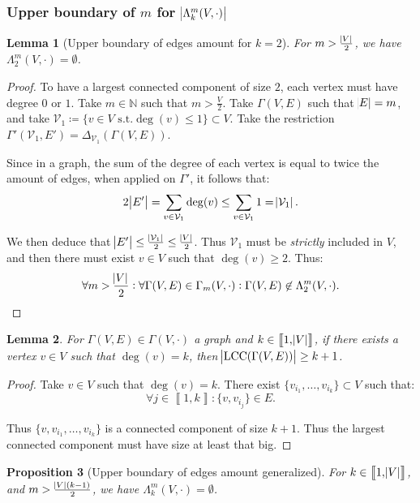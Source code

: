 \documentclass{article}
\newtheorem{lemma}{Lemma}[section]
\newtheorem{proposition}[lemma]{Proposition}
\theoremstyle{definition}
\theoremstyle{remark}
\DeclareMathOperator{\LCC}{LCC}
\newcommand{\N}{\mathbb N}
\newcommand{\intint}[2]{\left\llbracket#1, #2\right\rrbracket}
\newcommand{\st}{\text{ s.t.}}
\begin{document}
		\subsubsection{Upper boundary of $m$ for $\abs {\Lambda_k^m(V, \cdot)}$}
			\begin{lemma}[Upper boundary of edges amount for $k=2$]\label{lemma:upper boundary k=2} For $m > \frac {\abs V}2$, we have $\Lambda_2^m(V, \cdot) = \emptyset$.
			\end{lemma}

			\begin{proof} To have a largest connected component of size $2$, each vertex must have degree $0$ or $1$. Take $m \in \N$ such that $m > \frac V2$. Take
			$\Gamma(V, E)$ such that $\abs E = m$, and take $\mathcal V_1 \coloneqq \{v \in V \st \deg(v) \leq 1\} \subset V$. Take the restriction
			$\Gamma'(\mathcal V_1, E') = \Delta_{\mathcal V_1}(\Gamma(V, E))$.

			Since in a graph, the sum of the degree of each vertex is equal to twice the amount of edges, when applied on $\Gamma'$, it follows that:
			\[2\abs {E'} = \sum_{v \in \mathcal V_1}\deg(v) \leq \sum_{v \in \mathcal V_1}1 = \abs {\mathcal V_1}.\]

			We then deduce that $\abs {E'} \leq \frac {\abs {\mathcal V_1}}2 \leq \frac {\abs V}2$. Thus $\mathcal V_1$ must be \textit{strictly} included in $V$,
			and then there must exist $v \in V$ such that $\deg(v) \geq 2$. Thus:
			\[\forall m > \frac {\abs V}2 : \forall \Gamma(V, E) \in \Gamma_m(V, \cdot) : \Gamma(V, E) \not \in \Lambda_2^m(V, \cdot).\]
			\end{proof}

			\begin{lemma} For $\Gamma(V, E) \in \Gamma(V, \cdot)$ a graph and $k \in \intint 1{\abs V}$, if there exists a vertex $v \in V$ such that $\deg(v) = k$,
			then $\abs {\LCC(\Gamma(V, E))} \geq k+1$.
			\end{lemma}

			\begin{proof} Take $v \in V$ such that $\deg(v) = k$. There exist $\{v_{i_1}, \ldots, v_{i_k}\} \subset V$ such that:
			\[\forall j \in \intint 1k : \{v, v_{i_j}\} \in E.\]

			Thus $\{v, v_{i_1}, \ldots, v_{i_k}\}$ is a connected component of size $k+1$. Thus the largest connected component must have size at least that big.
			\end{proof}

			\begin{proposition}[Upper boundary of edges amount generalized] For $k \in \intint 1{\abs V}$, and $m > \frac {\abs V(k-1)}2$, we have $\Lambda_k^m(V, \cdot) = \emptyset$.
			\end{proposition}
\end{document}

